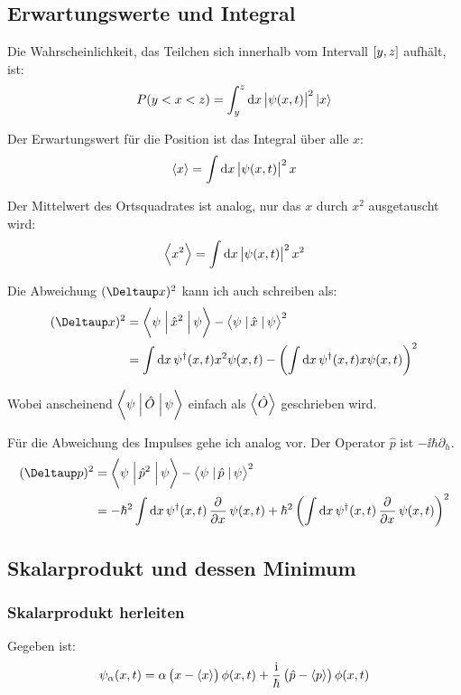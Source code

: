 \subsection{Erwartungswerte und Integral}

Die Wahrscheinlichkeit, das Teilchen sich innerhalb vom Intervall $\intcc{y,
z}$ aufhält, ist:
\[
	P(y < x < z) = \int_y^z \dif x \, \abs{\psi(x, t)}^2 \ket x
\]

Der Erwartungswert für die Position ist das Integral über alle $x$:
\[
	\bracket x = \int\dif x \, \abs{\psi(x, t)}^2 x
\]

Der Mittelwert des Ortsquadrates ist analog, nur das $x$ durch $x^2$
ausgetauscht wird:
\[
	\bracket{x^2} = \int\dif x \, \abs{\psi(x, t)}^2 x^2
\]

Die Abweichung $(\Deltaup x)^2$ kann ich auch schreiben als:
\cite{wikipedia-quantum_operators}
\begin{align*}
	(\Deltaup x)^2
	&= \braproket{\psi}{\hat x^2}{\psi} - \braproket{\psi}{\hat x}{\psi}^2 \\
	&= \int \dif x \, \psi^\dagger(x, t) x^2 \psi(x, t) - \del{\int \dif x \, \psi^\dagger(x, t) x \psi(x, t)}^2
\end{align*}

Wobei anscheinend $\braproket{\psi}{\hat O}{\psi}$ einfach als $\left\langle \hat
O \right\rangle$ geschrieben wird.

Für die Abweichung des Impulses gehe ich analog vor. Der Operator $\hat p$ ist
$- \ii \hbar \partial_h$.
\begin{align*}
	(\Deltaup p)^2
	&= \braproket{\psi}{\hat p^2}{\psi} - \braproket{\psi}{\hat p}{\psi}^2 \\
	&= - \hbar^2 \int \dif x \, \psi^\dagger(x, t) \dpd{}x \psi(x, t) + \hbar^2 \del{\int \dif x \, \psi^\dagger(x, t) \dpd{}x \psi(x, t)}^2
\end{align*}

\subsection{Skalarprodukt und dessen Minimum}

\subsubsection{Skalarprodukt herleiten}

Gegeben ist:
\[
	\psi_\alpha(x, t) = \alpha \del{x - \bracket x} \phi(x, t) + \frac\ii\hbar \del{\hat p - \bracket p} \phi(x, t)
\]

